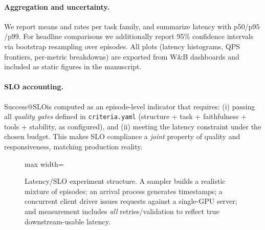 \documentclass[11pt]{article}
\newcommand{\pninetyfive}{\ensuremath{\mathrm{p95}}}
\newcommand{\pninetynine}{\ensuremath{\mathrm{p99}}}
\newcommand{\slo}{\ensuremath{\mathrm{SLO}}}
\begin{document}
\paragraph{Aggregation and uncertainty.}
We report means and rates per task family, and summarize latency with p50/\pninetyfive/\pninetynine.
For headline comparisons we additionally report 95\% confidence intervals via bootstrap resampling over episodes.
All plots (latency histograms, QPS frontiers, per-metric breakdowns) are exported from W\&B dashboards and included as static figures in the manuscript.

\paragraph{SLO accounting.}
Success@\slo is computed as an episode-level indicator that requires:
(i) passing all \emph{quality gates} defined in \texttt{criteria.yaml} (structure + task + faithfulness + tools + stability, as configured), and
(ii) meeting the latency constraint under the chosen budget.
This makes SLO compliance a \emph{joint} property of quality and responsiveness, matching production reality.

\begin{figure}[t]
\centering
\begin{adjustbox}{max width=\linewidth}
\end{adjustbox}
\caption{Latency/SLO experiment structure.
A sampler builds a realistic mixture of episodes; an arrival process generates timestamps; a concurrent client driver issues requests against a single-GPU server; and measurement includes \emph{all} retries/validation to reflect true downstream-usable latency.}
\label{fig:slo-harness}
\end{figure}
\end{document}
